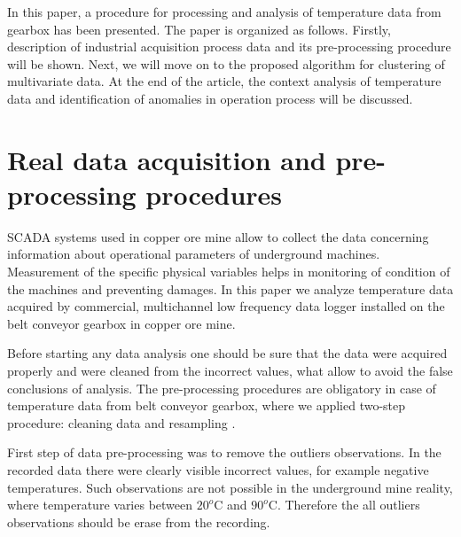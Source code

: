 In this paper, a procedure for processing and analysis of temperature data from gearbox has been presented. The paper is organized as follows. Firstly, description of industrial acquisition process data and its pre-processing procedure will be shown. Next, we will move on to the proposed algorithm for clustering of multivariate data. At the end of the article, the context analysis of temperature data and identification of anomalies in operation process will be discussed.
\section{Real data acquisition and pre-processing procedures}
SCADA systems used in copper ore mine allow to collect the data concerning information about operational parameters of underground machines. Measurement of the specific physical variables helps in monitoring  of condition of the machines and preventing damages. In this paper we analyze temperature data acquired by commercial, multichannel low frequency data logger installed on the belt conveyor gearbox in copper ore mine.

Before starting any data analysis one should be sure that the data were acquired properly and were cleaned from the incorrect values, what allow to avoid the false conclusions of analysis. The pre-processing procedures are obligatory in case of temperature data from belt conveyor gearbox, where we applied two-step procedure: cleaning data and resampling \cite{Wodecki}.

First step of data pre-processing was to remove the outliers observations. In the recorded data there were clearly visible incorrect values, for example negative temperatures. Such observations are not possible in the underground mine reality, where temperature varies between $20^o$C and $90^o$C. Therefore the all outliers observations should be erase from the recording.

